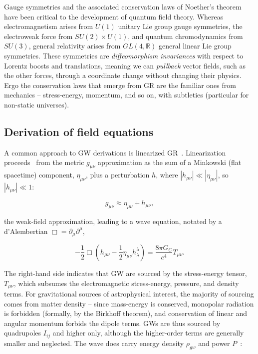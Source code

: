 Gauge symmetries and the associated conservation laws of Noether's theorem have been critical to the development of quantum field theory. 
Whereas electromagnetism arises from $U(1)$ unitary Lie group gauge symmetries, the electroweak force from $SU(2) \times U(1)$, and quantum chromodynamics from $SU(3)$, general relativity arises from $GL(4, \mathbb{R})$ general linear Lie group symmetries. 
These symmetries are \textit{diffeomorphism invariances} with respect to Lorentz boosts and translations, meaning we can \textit{pullback} vector fields, such as the other forces, through a coordinate change without changing their physics.
Ergo the conservation laws that emerge from GR are the familiar ones from mechanics -- stress-energy, momentum, and so on, with subtleties (particular for non-static universes).



        \subsection{Derivation of field equations}
        \label{field_equations}

            A common approach to GW derivations is linearized GR~\cite{FlanaganHughes2005}.
            Linearization proceeds~\cite{AdhikariThesis} from the metric $g_{\mu\nu}$ approximation as the sum of a Minkowski (flat spacetime) component, $\eta_{\mu\nu}$, plus a perturbation $h$, where $|h_{\mu\nu}| \ll |\eta_{\mu\nu}|$, so $|h_{\mu\nu}| \ll 1$:

\begin{equation}
g_{\mu \nu} \approx \eta_{\mu \nu} + h_{\mu \nu},
\label{perturbation_eq}
\end{equation}

\noindent the weak-field approximation, leading to a wave equation, notated by a d'Alembertian $\Box = \partial_\mu \partial^\mu$,

\begin{equation}
-\frac{1}{2} \Box \left(h_{\mu \nu} - \frac{1}{2} \eta_{\mu \nu} h_{\lambda}^{\lambda} \right) = \frac{8 \pi G_C}{c^4} T_{\mu \nu}.
\label{Ballmer_wave_eq}
\end{equation}

The right-hand side indicates that GW are sourced by the stress-energy tensor, $T_{\mu\nu}$, which subsumes the electromagnetic stress-energy, pressure, and density terms. 
For gravitational sources of astrophysical interest, the majority of sourcing comes from matter density -- since mass-energy is conserved, monopolar radiation is forbidden (formally, by the Birkhoff theorem), and conservation of linear and angular momentum forbids the dipole terms. 
GWs are thus sourced by quadrupoles $I_{ij}$ and higher only, although the higher-order terms are generally smaller and neglected. 
The wave does carry energy density $\rho_{gw}$ and power $P$~\cite{BallmerThesis}:

